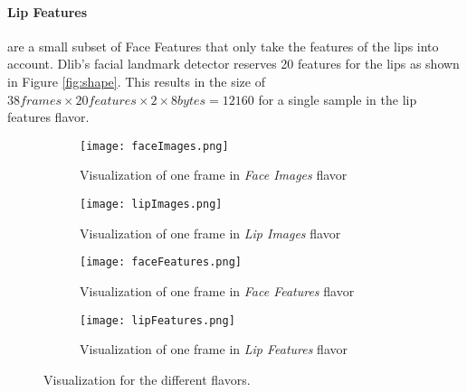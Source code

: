 \paragraph{Lip Features} are a small subset of Face Features that only take the features of the lips into account. 
Dlib's facial landmark detector
reserves 20 features for the lips as shown in Figure \ref{fig:shape}.
This results in the size of $38 frames \times 20 features \times 2 \times 8 bytes = 12160$ for a single sample in the lip features flavor.

\begin{figure}
\centering
\parbox{\textwidth}{
\begin{subfigure}{.5\textwidth}
  \centering
  \captionsetup{width=.8\linewidth}
  \texttt{[image: faceImages.png]}
  \caption{Visualization of one frame in \emph{Face Images} flavor}
\end{subfigure}%
\begin{subfigure}{.5\textwidth}
  \centering
  \captionsetup{width=.8\linewidth}
  \texttt{[image: lipImages.png]}
  \caption{Visualization of one frame in \emph{Lip Images} flavor}
\end{subfigure}
}
\parbox{\textwidth}{
\begin{subfigure}{.5\textwidth}
  \centering
  \captionsetup{width=.8\linewidth}
  \texttt{[image: faceFeatures.png]}
  \caption{Visualization of one frame in \emph{Face Features} flavor}
\end{subfigure}%
\begin{subfigure}{.5\textwidth}
  \centering
  \captionsetup{width=.8\linewidth}
  \texttt{[image: lipFeatures.png]}
  \caption{Visualization of one frame in \emph{Lip Features} flavor}
\end{subfigure}%
}
\caption{Visualization for the different flavors.}
\label{fig:flavors}
\end{figure}

